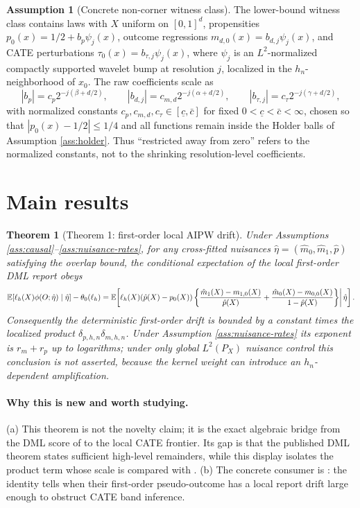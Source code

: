 \documentclass[11pt]{article}
\newcommand{\E}{\mathbb{E}}
\theoremstyle{definition}
\newtheorem{assumption}{Assumption}
\theoremstyle{plain}
\newtheorem{theorem}{Theorem}
\theoremstyle{remark}
\begin{document}
\begin{assumption}[Concrete non-corner witness class]\label{ass:witness}
The lower-bound witness class contains laws with \(X\) uniform on \([0,1]^d\),
propensities \(p_0(x)=1/2+b_p\psi_j(x)\), outcome regressions
\(m_{d,0}(x)=b_{d,j}\psi_j(x)\), and CATE perturbations
\(\tau_0(x)=b_{\tau,j}\psi_j(x)\), where \(\psi_j\) is an \(L^2\)-normalized
compactly supported wavelet bump at resolution \(j\), localized in the
\(h_n\)-neighborhood of \(x_0\).  The raw coefficients scale as
\[
|b_p|=c_p2^{-j(\beta+d/2)},\qquad
|b_{d,j}|=c_{m,d}2^{-j(\alpha+d/2)},\qquad
|b_{\tau,j}|=c_\tau2^{-j(\gamma+d/2)},
\]
with normalized constants \(c_p,c_{m,d},c_\tau\in[\underline c,\bar c]\) for
fixed \(0<\underline c<\bar c<\infty\), chosen so that
\(|p_0(x)-1/2|\le1/4\) and all functions remain inside the Holder balls of
Assumption \ref{ass:holder}.  Thus ``restricted away from zero'' refers to
the normalized constants, not to the shrinking resolution-level coefficients.
\end{assumption}

\section{Main results}
\begin{theorem}[Theorem 1: first-order local AIPW drift]\label{thm:first-order-drift}
Under Assumptions \ref{ass:causal}--\ref{ass:nuisance-rates}, for any
cross-fitted nuisances \(\hat\eta=(\hat m_0,\hat m_1,\hat p)\) satisfying the
overlap bound, the conditional expectation of the local first-order DML report
obeys
\[
\E[\ell_h(X)\phi(O;\hat\eta)\mid \hat\eta]-\theta_0(\ell_h)
=\E\!\left[
\ell_h(X)(\hat p(X)-p_0(X))
\left\{ {\hat m_1(X)-m_{1,0}(X)\over \hat p(X)}
       +{\hat m_0(X)-m_{0,0}(X)\over 1-\hat p(X)}\right\}
\middle|\,\hat\eta\right].
\]
Consequently the deterministic first-order drift is bounded by a constant
times the localized product
\(\delta_{p,h,n}\delta_{m,h,n}\).  Under Assumption
\ref{ass:nuisance-rates} its exponent is \(r_m+r_p\) up to logarithms; under
only global \(L^2(P_X)\) nuisance control this conclusion is not asserted,
because the kernel weight can introduce an \(h_n\)-dependent amplification.
\end{theorem}
\paragraph{Why this is new and worth studying.}
(a) This theorem is not the novelty claim; it is the exact algebraic bridge
from the DML score of \citet[\S3]{ChernozhukovEtAl2018DML} to the local CATE
frontier.  Its gap is that the published DML theorem states sufficient
high-level remainders, while this display isolates the product term whose
scale is compared with \citet[\S2--\S4]{KennedyBalakrishnanRobinsWasserman2024MinimaxCATE}.
(b) The concrete consumer is \citet{SemenovaChernozhukov2021DMLCATE}: the
identity tells when their first-order pseudo-outcome has a local report drift
large enough to obstruct CATE band inference.
\end{document}
